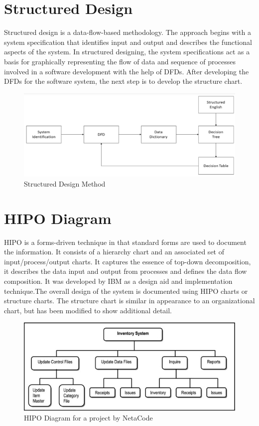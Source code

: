\documentclass[a4paper,12pt]{report}
\begin{document}
\section{Structured Design}

	Structured design is a data-flow-based methodology. The approach begins with a system specification that identifies input and output and describes the functional aspects of the system.  In structured designing, the system specifications act as a basis for graphically representing the flow of data and sequence of processes involved in a software development with the help of DFDs. After developing the DFDs for the software system, the next step is to develop the structure chart.
	
	
\begin{figure}[h]
	\centering
	\includegraphics[width=0.7\linewidth]{9_2}
	\caption{Structured Design Method}
	\label{fig:92}
\end{figure}
\section{HIPO Diagram}
HIPO is a forms-driven technique in that standard forms are used to document the information. It consists of a hierarchy chart and an associated set of input/process/output charts. It captures the essence of top-down decomposition, it describes the data input and output from processes and defines the data flow composition. It was developed by IBM as a design aid and implementation technique.The overall design of the system is documented using HIPO charts or structure charts. The structure chart is similar in appearance to an organizational chart, but has been modified to show additional detail.
\begin{figure}
	\centering
	\includegraphics[width=0.7\linewidth]{9_3}
	\caption{HIPO Diagram for a project by NetaCode}
	\label{fig:93}
\end{figure}
\end{document}
